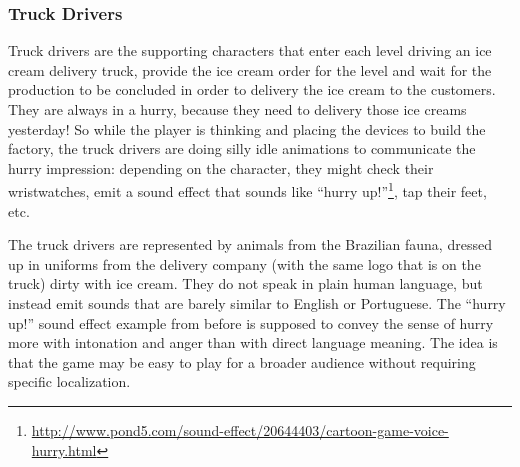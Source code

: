 \documentclass[a4paper]{scrartcl}
\begin{document}
        \subsubsection{Truck Drivers}
            Truck drivers are the supporting characters that enter each level
            driving an ice cream delivery truck, provide the ice cream order for
            the level and wait for the production to be concluded in order to
            delivery the ice cream to the customers. They are always in a hurry,
            because they need to delivery those ice creams yesterday! So while
            the player is thinking and placing the devices to build the factory,
            the truck drivers are doing silly idle animations to communicate the
            hurry impression: depending on the character, they might check their
            wristwatches, emit a sound effect that sounds like ``hurry
            up!''\footnote{\url{http://www.pond5.com/sound-effect/20644403/cartoon-game-voice-hurry.html}},
            tap their feet, etc.

            The truck drivers are represented by animals from the Brazilian
            fauna, dressed up in uniforms from the delivery company (with the
            same logo that is on the truck) dirty with ice cream. They do not
            speak in plain human language, but instead emit sounds that are
            barely similar to English or Portuguese. The ``hurry up!'' sound
            effect example from before is supposed to convey the sense of hurry
            more with intonation and anger than with direct language meaning.
            The idea is that the game may be easy to play for a broader audience
            without requiring specific localization.
\end{document}
